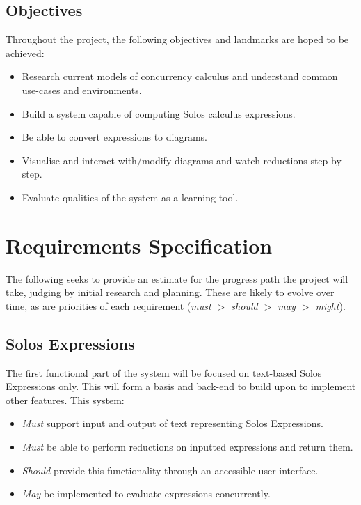 \documentclass{article}
\begin{document}
\subsection{Objectives}
Throughout the project, the following objectives and landmarks are hoped to be achieved:
\begin{itemize}
	\item Research current models of concurrency calculus and understand common use-cases and environments.
	\item Build a system capable of computing Solos calculus expressions.
	\item Be able to convert expressions to diagrams.
	\item Visualise and interact with/modify diagrams and watch reductions step-by-step.
	\item Evaluate qualities of the system as a learning tool.
\end{itemize}


\section{Requirements Specification}
The following seeks to provide an estimate for the progress path the project will take, judging by initial research and planning. These are likely to evolve over time, as are priorities of each requirement (\textit{must $>$ should $>$ may $>$ might}).

\subsection{Solos Expressions}\label{subsec:reqs_solo_expr}
The first functional part of the system will be focused on text-based Solos Expressions only. This will form a basis and back-end to build upon to implement other features.
This system:
\begin{itemize}
	\item \textit{Must} support input and output of text representing Solos Expressions.
	\item \textit{Must} be able to perform reductions on inputted expressions and return them.
	\item \textit{Should} provide this functionality through an accessible user interface.
	\item \textit{May} be implemented to evaluate expressions concurrently.
\end{itemize}
\end{document}
